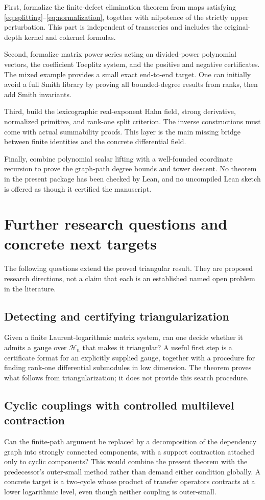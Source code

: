 \documentclass[11pt,a4paper]{article}
\numberwithin{equation}{section}
\theoremstyle{definition}
\theoremstyle{remark}\newtheorem{remark}[theorem]{Remark}
\newcommand{\Hh}{\mathcal H}\newcommand{\Ll}{\mathcal L}
\begin{document}
First, formalize the finite-defect elimination theorem from maps satisfying \eqref{eq:splitting}--\eqref{eq:normalization}, together with nilpotence of the strictly upper perturbation. This part is independent of transseries and includes the original-depth kernel and cokernel formulas.

Second, formalize matrix power series acting on divided-power polynomial vectors, the coefficient Toeplitz system, and the positive and negative certificates. The mixed example provides a small exact end-to-end target. One can initially avoid a full Smith library by proving all bounded-degree results from ranks, then add Smith invariants.

Third, build the lexicographic real-exponent Hahn field, strong derivative, normalized primitive, and rank-one split criterion. The inverse constructions must come with actual summability proofs. This layer is the main missing bridge between finite identities and the concrete differential field.

Finally, combine polynomial scalar lifting with a well-founded coordinate recursion to prove the graph-path degree bounds and tower descent. No theorem in the present package has been checked by Lean, and no uncompiled Lean sketch is offered as though it certified the manuscript.

\section{Further research questions and concrete next targets}
\label{sec:future}
The following questions extend the proved triangular result. They are proposed research directions, not a claim that each is an established named open problem in the literature.

\subsection{Detecting and certifying triangularization}
Given a finite Laurent-logarithmic matrix system, can one decide whether it admits a gauge over $\Hh_n$ that makes it triangular? A useful first step is a certificate format for an explicitly supplied gauge, together with a procedure for finding rank-one differential submodules in low dimension. The theorem proves what follows from triangularization; it does not provide this search procedure.

\subsection{Cyclic couplings with controlled multilevel contraction}
Can the finite-path argument be replaced by a decomposition of the dependency graph into strongly connected components, with a support contraction attached only to cyclic components? This would combine the present theorem with the predecessor's outer-small method rather than demand either condition globally. A concrete target is a two-cycle whose product of transfer operators contracts at a lower logarithmic level, even though neither coupling is outer-small.
\end{document}
